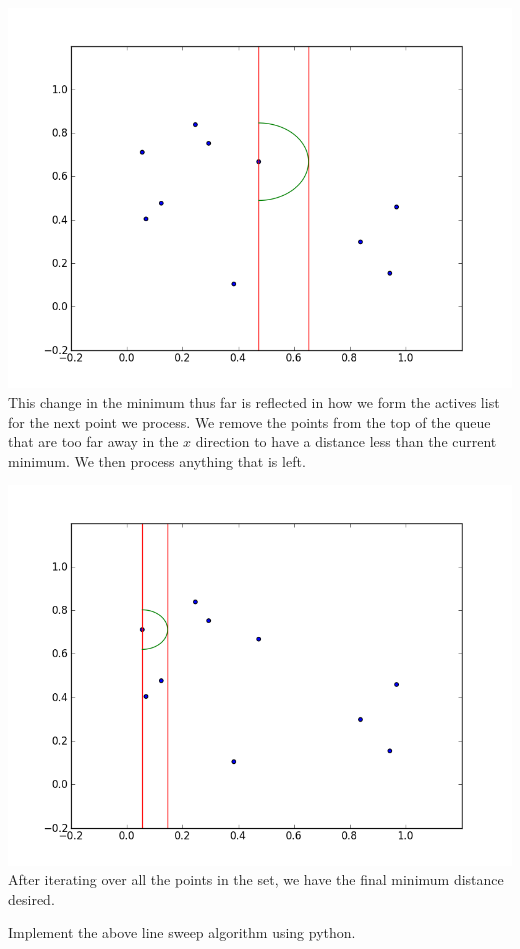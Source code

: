 \includegraphics[width = \textwidth]{simple2.png}
This change in the minimum thus far is reflected in how we form the actives list for the next point we process. 
We remove the points from the top of the queue that are too far away in the $x$ direction to have a distance less than the current minimum. 
We then process anything that is left.

\includegraphics[width = \textwidth]{simple8.png}
After iterating over all the points in the set, we have the final minimum distance desired.

\begin{problem}
Implement the above line sweep algorithm using python.
\end{problem}

